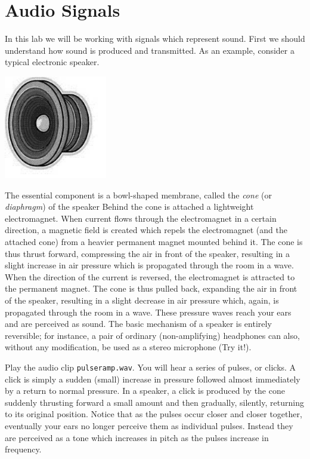 
\def\x{{\bf x}}
\def\q{{\bf q}}
\def\p{{\bf p}}
\def\v{{\bf v}}


\section*{Audio Signals}

In this lab we will be working with signals which represent sound.
First we should understand how sound is produced and transmitted.
As an example, consider a typical electronic speaker.

\begin{center}\includegraphics[width=45mm]{speaker}\end{center}

The essential component is a bowl-shaped membrane, called the \emph{cone} (or \emph{diaphragm}) of the speaker
 Behind the cone is attached a lightweight electromagnet.
 When current flows through the electromagnet in a certain direction, a magnetic field is created which repels the electromagnet (and the attached cone) from a  heavier permanent magnet mounted behind it.
 The cone is thus thrust forward, compressing the air in front of the speaker, resulting in a slight increase in air pressure which is propagated through the room in a wave.
 When the direction of the current is reversed, the electromagnet is attracted to the permanent magnet.
 The cone is thus pulled back, expanding the air in front of the speaker, resulting in a slight decrease in air pressure which, again, is propagated through the room in a wave.
 These pressure waves reach your ears and are perceived as sound.
 The basic mechanism of a speaker is entirely reversible; for instance, a pair of ordinary (non-amplifying) headphones can also, without any modification, be used as a stereo microphone (Try it!).

Play the audio clip \texttt{pulseramp.wav}.
You will hear a series of pulses, or clicks.
A click is simply a sudden (small) increase in pressure followed almost immediately by a return to normal pressure.
In a speaker, a click is produced by the cone suddenly thrusting forward a small amount and then gradually, silently, returning to its original position.
Notice that as the pulses occur closer and closer together, eventually your ears no longer perceive them as individual pulses.
Instead they are perceived as a tone which increases in pitch as the pulses increase in frequency.

